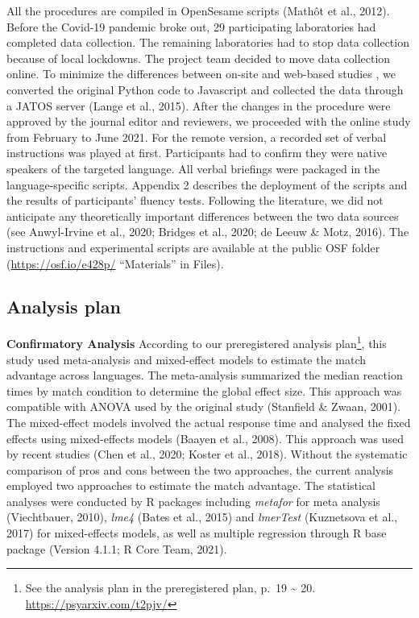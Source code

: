 \documentclass[
  man]{apa6}
\begin{document}
All the procedures are compiled in OpenSesame scripts (Mathôt et al., 2012). Before the Covid-19 pandemic broke out, 29 participating laboratories had completed data collection. The remaining laboratories had to stop data collection because of local lockdowns. The project team decided to move data collection online. To minimize the differences between on-site and web-based studies , we converted the original Python code to Javascript and collected the data through a JATOS server (Lange et al., 2015). After the changes in the procedure were approved by the journal editor and reviewers, we proceeded with the online study from February to June 2021. For the remote version, a recorded set of verbal instructions was played at first. Participants had to confirm they were native speakers of the targeted language. All verbal briefings were packaged in the language-specific scripts. Appendix 2 describes the deployment of the scripts and the results of participants' fluency tests. Following the literature, we did not anticipate any theoretically important differences between the two data sources (see Anwyl-Irvine et al., 2020; Bridges et al., 2020; de Leeuw \& Motz, 2016). The instructions and experimental scripts are available at the public OSF folder (\url{https://osf.io/e428p/} ``Materials'' in Files).

\hypertarget{analysis-plan}{%
\subsection{Analysis plan}\label{analysis-plan}}

\textbf{Confirmatory Analysis} According to our preregistered analysis plan\footnote{See the analysis plan in the preregistered plan, p.~19 \textasciitilde{} 20. \url{https://psyarxiv.com/t2pjv/}}, this study used meta-analysis and mixed-effect models to estimate the match advantage across languages. The meta-analysis summarized the median reaction times by match condition to determine the global effect size. This approach was compatible with ANOVA used by the original study (Stanfield \& Zwaan, 2001). The mixed-effect models involved the actual response time and analysed the fixed effects using mixed-effects models (Baayen et al., 2008). This approach was used by recent studies (Chen et al., 2020; Koster et al., 2018). Without the systematic comparison of pros and cons between the two approaches, the current analysis employed two approaches to estimate the match advantage.
The statistical analyses were conducted by R packages including \emph{metafor} for meta analysis (Viechtbauer, 2010), \emph{lme4} (Bates et al., 2015) and \emph{lmerTest} (Kuznetsova et al., 2017) for mixed-effects models, as well as multiple regression through R base package (Version 4.1.1; R Core Team, 2021).
\end{document}
